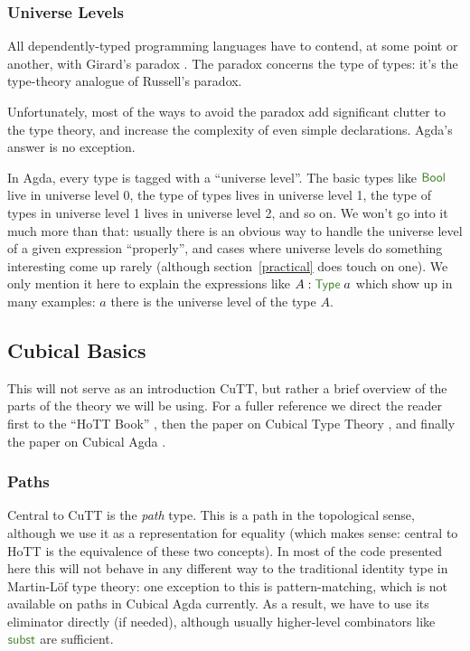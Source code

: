 \begin{subappendices}
\subsubsection{Universe Levels}
All dependently-typed programming languages have to contend, at some point or
another, with Girard's paradox
\cite{girardInterpretationFonctionelleElimination1972}.
The paradox concerns the type of types: it's the type-theory analogue of
Russell's paradox.

Unfortunately, most of the ways to avoid the paradox add significant clutter to
the type theory, and increase the complexity of even simple declarations.
Agda's answer is no exception.

In Agda, every type is tagged with a ``universe level''.
The basic types like \(\AgdaDatatype{Bool}\) live in universe level 0, the type
of types lives in universe level 1, the type of types in universe level 1 lives
in universe level 2, and so on.
We won't go into it much more than that: usually there is an obvious way to
handle the universe level of a given expression ``properly'', and cases where
universe levels do something interesting come up rarely (although
section~\ref{practical} does touch on one).
We only mention it here to explain the expressions like \(A :
\AgdaDatatype{Type} \; a\) which show up in many examples: \(a\) there is the
universe level of the type \(A\).
\subsection{Cubical Basics}
This will not serve as an introduction CuTT,
but rather a brief overview of the parts of the theory we will be using.
For a fuller reference we direct the reader first to the ``HoTT Book''
\cite{hottbook}, then the paper on Cubical Type Theory
\cite{cohenCubicalTypeTheory2016}, and finally the paper on Cubical Agda
\cite{vezzosiCubicalAgdaDependently2019}.
\subsubsection{Paths}
Central to CuTT is the \emph{path} type.
This is a path in the topological sense, although we use it as a representation
for equality (which makes sense: central to HoTT is the
equivalence of these two concepts).
In most of the code presented here this will not behave in any different way to
the traditional identity type in Martin-Löf type theory: one exception to this
is pattern-matching, which is not available on paths in Cubical Agda currently.
As a result, we have to use its eliminator directly (if needed), although
usually higher-level combinators like \(\AgdaFunction{subst}\) are sufficient.


\end{subappendices}
